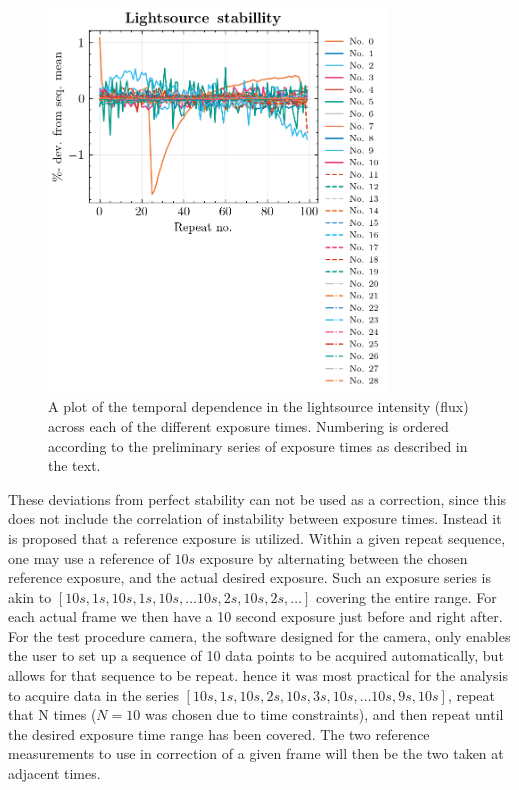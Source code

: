 \documentclass[../main.tex]{subfiles}
\begin{document}
		\begin{figure}
			\centering			\includegraphics[width=0.8\textwidth]{lightsource.png}
			\caption{A plot of the temporal dependence in the lightsource intensity (flux) across each of the different exposure times. Numbering is ordered according to the preliminary series of exposure times as described in the text.}
			\label{fig:lightsourcestability}
		\end{figure}
		
		These deviations from perfect stability can not be used as a correction, since this does not include the correlation of instability between exposure times. Instead it is proposed that a reference exposure is utilized. Within a given repeat sequence, one may use a reference of $10s$ exposure by alternating between the chosen reference exposure, and the actual desired exposure. Such an exposure series is akin to $[10s, 1s, 10s, 1s, 10s, \dots 10s, 2s, 10s, 2s,\dots]$ covering the entire range. For each actual frame we then have a 10 second exposure just before and right after. For the test procedure camera, the software designed for the camera, only enables the user to set up a sequence of 10 data points to be acquired automatically, but allows for that sequence to be repeat. hence it was most practical for the analysis to acquire data in the series $[10s, 1s, 10s, 2s, 10s, 3s, 10s, \dots 10s, 9s, 10s]$, repeat that N times ($N=10$ was chosen due to time constraints), and then repeat until the desired exposure time range has been covered. The two reference measurements to use in correction of a given frame will then be the two taken at adjacent times. 
		
\end{document}
